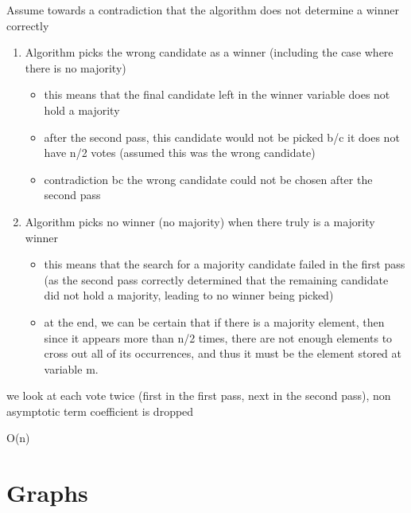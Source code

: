 {
    \item Assume towards a contradiction that the algorithm does not determine a winner correctly
    \begin{enumerate}
        \item Algorithm picks the wrong candidate as a winner (including the case where there is no majority)
        \begin{itemize}
            \item this means that the final candidate left in the winner variable does not hold a majority
            \item after the second pass, this candidate would not be picked b/c it does not have n/2 votes (assumed this was the wrong candidate)
            \item contradiction bc the wrong candidate could not be chosen after the second pass
        \end{itemize}
        \item Algorithm picks no winner (no majority) when there truly is a majority winner
        \begin{itemize}
            \item this means that the search for a majority candidate failed in the first pass (as the second pass correctly determined that the remaining candidate did not hold a majority, leading to no winner being picked)
            \item at the end, we can be certain that if there is a majority element, then since it appears more than n/2 times, there are not enough elements to cross out all of its occurrences, and thus it must be the element stored at variable m.
        \end{itemize}

    \end{enumerate}

}
{
    \item we look at each vote twice (first in the first pass, next in the second pass), non asymptotic term coefficient  is dropped 
    \item O(n)
}




\chapter{Graphs}

